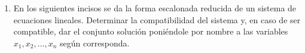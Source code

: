 \documentclass[11pt]{article}
\begin{document}
\begin{enumerate}[\hspace{-5mm} 1) ]
\item En los siguientes incisos se da la forma escalonada reducida de un sistema de ecuaciones lineales. Determinar la compatibilidad del sistema y, en caso de ser compatible, dar el conjunto solución poniéndole por nombre a las variables \(x_1, x_2, \ldots, x_n\) según corresponda.

\begin{enumerate}[a) ]
\end{enumerate}
\end{enumerate}
\end{document}
